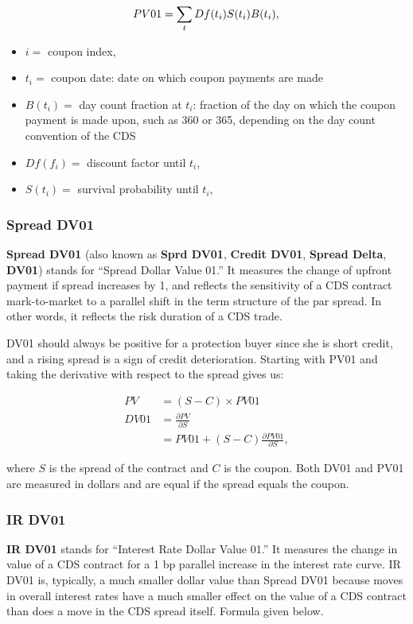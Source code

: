 \documentclass{jss}
\begin{document}
\begin{displaymath}
PV01 =  \sum_tDf(t_i)S(t_i)B(t_i), \nonumber\\
\end{displaymath}
\begin{itemize}
\item $i =$ coupon index,
\item $t_i =$ coupon date: date on which coupon payments are made
\item $B(t_i) =$ day count fraction at $t_i$: fraction of the day on which the coupon payment is made upon, such as 360 or 365, depending on the day count convention of the CDS
\item $Df(f_i) =$ discount factor until $t_i$,
\item $S(t_i) =$ survival probability until $t_i$,
\end{itemize}

\subsubsection{Spread DV01}
\label{sec:spread.DV.01}

\textbf{Spread DV01} (also known as \textbf{Sprd DV01}, \textbf{Credit DV01}, \textbf{Spread Delta}, \textbf{DV01}) stands for ``Spread Dollar Value 01.'' It measures the change of upfront payment if spread increases by 1, and reflects the sensitivity of a CDS contract mark-to-market to a parallel shift in the term structure of the par spread. In other words, it reflects the risk duration of a CDS trade. 

DV01 should always be positive for a protection buyer since she is short credit, and a rising spread is a sign of credit deterioration. Starting with PV01 and taking the derivative with respect to the spread gives us:

\begin{align*}
  PV &= (S - C) \times PV01 \\
  DV01 &= \frac{\partial PV}{\partial S} \\
  &= PV01 + (S - C) \frac{\partial PV01}{\partial S},
\end{align*}

where $S$ is the spread of the contract and $C$ is the coupon. Both DV01 and PV01 are measured in dollars and are equal if the spread equals the coupon.

\subsubsection{IR DV01}
\label{sec:IRDV01}
\textbf{IR DV01} stands for ``Interest Rate Dollar Value 01.'' It measures the change in value of a CDS contract for a 1 bp parallel increase in the interest rate curve. IR DV01 is, typically, a much smaller dollar value than Spread DV01 because moves in overall interest rates have a much smaller effect on the value of a CDS contract than does a move in the CDS spread itself. Formula given below.
\end{document}
